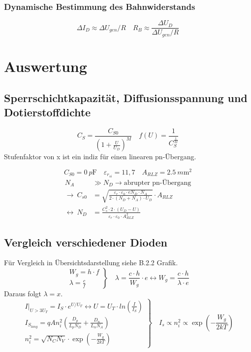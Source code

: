\documentclass[
	a4paper, %
	12pt, %
]{CSUniSchoolLabReport}
\newcommand{\pico}{p}
\newcommand{\milli}{m}
\begin{document}
\subsubsection{Dynamische Bestimmung des Bahnwiderstands}

\[
\Delta I_D \approx \Delta U_{gen}/R \quad R_B \approx \frac{\Delta U_D}{\Delta U_{gen}/R}
\]
\section{Auswertung}
\subsection{Sperrschichtkapazität, Diffusionsspannung und \\Dotierstoffdichte}
\[
C_S = \frac{C_{S0}}{(1+\frac{U}{U_D})^M}\quad f(U) = \frac{1}{C_S^\frac{1}{M}}
\]
Stufenfaktor von x ist ein indiz für einen linearen pn-Übergang.

\vspace{1em} 

\[
C_{S0} = \SI{0}{\pico\farad} \quad \varepsilon _{r_{si}} = 11,7 \quad A_{RLZ} = \SI{2.5}{\milli\metre\squared}
\]
\begin{align*}
N_A &\gg N_D \rightarrow \text{abrupter pn-Übergang} \\
\rightarrow\ C_{s0} &= \sqrt{\frac{\varepsilon_r \cdot \varepsilon_0 \cdot e N_D \cdot N_A}{2 \cdot (N_D + N_A) \cdot U_D}} \cdot A_{RLZ} \\
\leftrightarrow\ N_D &= \frac{C_s^2 \cdot 2 \cdot (U_D - U)}{\varepsilon_r \cdot \varepsilon_0 \cdot A_{RLZ}^2}
\end{align*}

\vspace{1em} 
\subsection{Vergleich verschiedener Dioden}
Für Vergleich in Übersichtsdarstellung siehe B.2.2 Grafik.
\[
\left.
\begin{array}{l}
W_g = h \cdot f \\
\lambda = \frac{c}{f}
\end{array}
\right\}
\quad \lambda = \frac{c\cdot h}{W_g} \cdot e \leftrightarrow W_g = \frac{c \cdot h}{\lambda \cdot e}
\]
Daraus folgt $\lambda = x$. \\

\[
\left.
\begin{array}{l}
I|_{U>3U_T} = I_S\cdot e^{U/U_T} \leftrightarrow U = U_T\cdot ln(\frac{I}{I_S}) \\
I_{S_{lang}} = q A n_i^2 \left( \frac{D_p}{L_p N_D} + \frac{D_n}{L_n N_A} \right) \\
n_i^2 = \sqrt{N_C N_V} \cdot \exp\left(-\frac{W_g}{2kT}\right)
\end{array}
\right\}
\quad I_s \varpropto n_i^2 \varpropto \exp\left(-\frac{W_g}{2kT}\right)
\]
\end{document}
